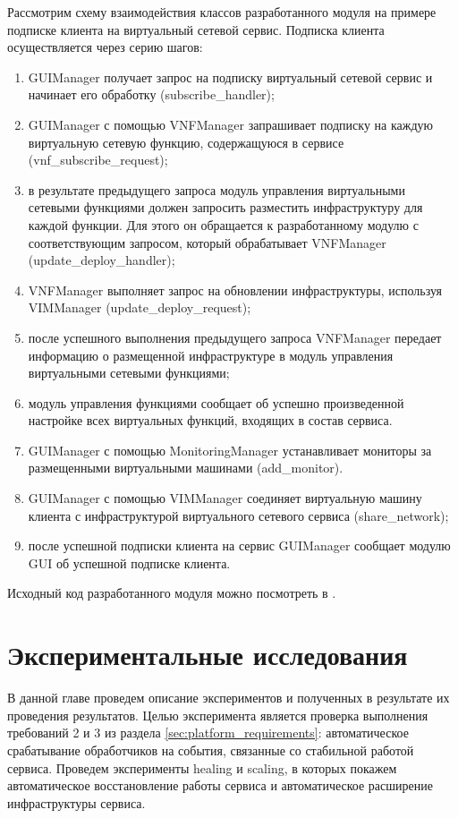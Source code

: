 \documentclass[oneside,final,14pt,a4paper]{extreport}
\begin{document}
Рассмотрим схему взаимодействия классов разработанного модуля на примере подписке клиента на виртуальный сетевой сервис. Подписка клиента осуществляется через серию шагов:
\begin{enumerate}
	\item GUIManager получает запрос на подписку виртуальный сетевой сервис и начинает его обработку (subscribe\_handler);
	\item GUIManager с помощью VNFManager запрашивает подписку на каждую виртуальную сетевую функцию, содержащуюся в сервисе (vnf\_subscribe\_request);
	\item в результате предыдущего запроса модуль управления виртуальными сетевыми функциями должен запросить разместить инфраструктуру для каждой функции. Для этого он обращается к разработанному модулю с соответствующим запросом, который обрабатывает VNFManager (update\_deploy\_handler);
	\item VNFManager выполняет запрос на обновлении инфраструктуры, используя VIMManager (update\_deploy\_request);
	\item после успешного выполнения предыдущего запроса VNFManager передает информацию о размещенной инфраструктуре в модуль управления виртуальными сетевыми функциями;
	\item модуль управления функциями сообщает об успешно произведенной настройке всех виртуальных функций, входящих в состав сервиса.
	\item GUIManager с помощью MonitoringManager устанавливает мониторы за размещенными виртуальными машинами (add\_monitor). 
	\item GUIManager с помощью VIMManager соединяет виртуальную машину клиента с инфраструктурой виртуального сетевого сервиса (share\_network);
	\item после успешной подписки клиента на сервис GUIManager сообщает модулю GUI об успешной подписке клиента.
\end{enumerate}

Исходный код разработанного модуля можно посмотреть в \cite{bib:source-code}.





\chapter{Экспериментальные исследования}
\label{chap:expirements}
В данной главе проведем описание экспериментов и полученных в результате их проведения результатов. Целью эксперимента является проверка выполнения требований 2 и 3 из раздела \ref{sec:platform_requirements}: автоматическое срабатывание обработчиков на события, связанные со стабильной работой сервиса. Проведем эксперименты healing и scaling, в которых покажем автоматическое восстановление работы сервиса и автоматическое расширение инфраструктуры сервиса.
\end{document}
